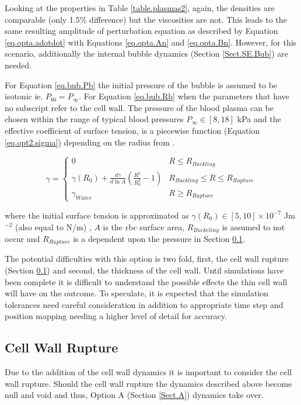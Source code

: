 \noindent Looking at the properties in Table \ref{table.plasmas2}, again, the densities are comparable (only 1.5\% difference) but the viscosities are not. This leads to the same resulting amplitude of perturbation equation as described by Equation \ref{eq.opta.adotdot} with Equations \ref{eq.opta.An} and \ref{eq.opta.Bn}. However, for this scenario, additionally the internal bubble dynamics (Section \ref{Sect.SE.Bub}) are needed.

 For Equation \ref{eq.bub.Pb} the initial pressure of the bubble is assumed to be isotonic ie. $P_{b0} = P_{\infty}$. For Equation \ref{eq.bub.Rb} when the parameters that have no subscript refer to the cell wall. The pressure of the blood plasma can be chosen within the range of typical blood pressures $P_{\infty} \in [8,18]$ kPa and  the effective coefficient of surface tension, is a piecewise function (Equation \ref{eq.opt2.sigma}) depending on the radius from \citet{Dollet2019}.
 
\begin{equation} \label{eq.opt2.sigma}
\gamma = \begin{cases} 
0 & R \leq R_{Buckling} \\
\gamma(R_0) + \frac{d \gamma}{d \ln A}  \left( \frac{R^2}{R_0^2} - 1 \right) & R_{Buckling}\leq R \leq R_{Rupture} \\
\gamma_{Water} & R \geq R_{Rupture} 
\end{cases}
\end{equation}

\noindent where the initial surface tension is approximated as $\gamma(R_0) \in [5,10] \times 10^{-7}$ Jm$^{-2}$ (also equal to N/m) \cite{Safran2005}, $A$ is the \ac{rbc} surface area, $R_{Buckeling}$ is assumed to not occur and $R_{Rupture}$ is a dependent upon the pressure in Section \ref{Sect.CellRupture}.

The potential difficulties with this option is two fold, first, the cell wall rupture (Section \ref{Sect.CellRupture}) and second, the thickness of the cell wall. Until simulations have been complete it is difficult to understand the possible effects the thin cell wall will have on the outcome. To speculate, it is expected that the simulation tolerances need careful consideration in addition to appropriate time step and position mapping needing a higher level of detail for accuracy. 

\subsection{Cell Wall Rupture} \label{Sect.CellRupture}
\noindent Due to the addition of the cell wall dynamics it is important to consider the cell wall rupture. Should the cell wall rupture the dynamics described above become null and void and thus, Option A (Section \ref{Sect.A}) dynamics take over. 

